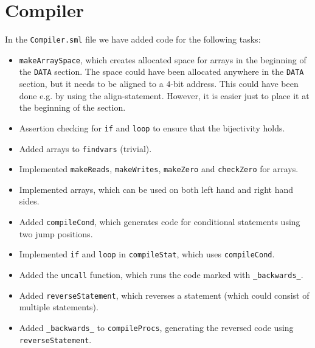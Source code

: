 \section{Compiler}

In the {\tt Compiler.sml} file we have added code for the following tasks:

\begin{itemize}
\item {\tt makeArraySpace}, which creates allocated space for arrays in the
      beginning of the {\tt DATA} section. The space could have been allocated
      anywhere in the {\tt DATA} section, but it needs to be aligned to a
      $4$-bit address. This could have been done e.g. by using the align-statement. 
      However, it is easier just to place it at the beginning of the section.
\item Assertion checking for {\tt if} and {\tt loop} to ensure that the
      bijectivity holds.
\item Added arrays to {\tt findvars} (trivial).
\item Implemented {\tt makeReads}, {\tt makeWrites}, {\tt makeZero} and
      {\tt checkZero} for arrays.
\item Implemented arrays, which can be used on both left hand and right hand sides.
\item Added {\tt compileCond}, which generates code for conditional statements
      using two jump positions.
\item Implemented {\tt if} and {\tt loop} in {\tt compileStat}, which uses
      {\tt compileCond}.
\item Added the {\tt uncall} function, which runs the code marked with
      {\tt \_backwards\_}.
\item Added {\tt reverseStatement}, which reverses a statement 
      (which could consist of multiple statements).
\item Added {\tt \_backwards\_} to {\tt compileProcs}, generating the reversed
      code using {\tt reverseStatement}.
\end{itemize}


